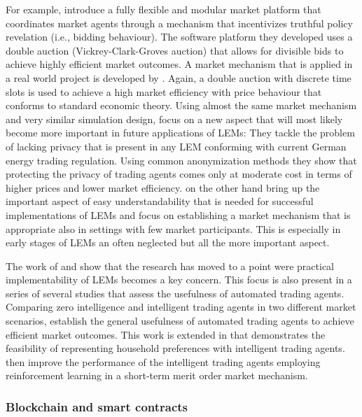 For example, \citet{Lamparter:2010} introduce a fully flexible and modular market platform that coordinates market agents through a mechanism that incentivizes truthful policy revelation (i.e., bidding behaviour). The software platform they developed uses a double auction (Vickrey-Clark-Groves auction) that allows for divisible bids to achieve highly efficient market outcomes. A market mechanism that is applied in a real world project is developed by \citet{Ilic:2012}. Again, a double auction with discrete time slots is used to achieve a high market efficiency with price behaviour that conforms to standard economic theory. Using almost the same market mechanism and very similar simulation design, \citet{Buchmann:2013} focus on a new aspect that will most likely become more important in future applications of LEMs: They tackle the problem of lacking privacy that is present in any LEM conforming with current German energy trading regulation. Using common anonymization methods they show that protecting the privacy of trading agents comes only at moderate cost in terms of higher prices and lower market efficiency. \citet{Rosen:2013} on the other hand bring up the important aspect of easy understandability that is needed for successful implementations of LEMs and focus on establishing a market mechanism that is appropriate also in settings with few market participants. This is especially in early stages of LEMs an often neglected but all the more important aspect.

The work of \citet{Buchmann:2013} and \citet{Rosen:2013} show that the research has moved to a point were practical implementability of LEMs becomes a key concern. This focus is also present in a series of several studies that assess the usefulness of automated trading agents. Comparing zero intelligence and intelligent trading agents in two different market scenarios, \citet{Mengelkamp:2017:Trading} establish the general usefulness of automated trading agents to achieve efficient market outcomes. This work is extended in \citet{Mengelkamp:2018:Clustering} that demonstrates the feasibility of representing household preferences with intelligent trading agents. \citet{Mengelkamp:2018c} then improve the performance of the intelligent trading agents employing reinforcement learning in a short-term merit order market mechanism.



\subsubsection{Blockchain and smart contracts}

